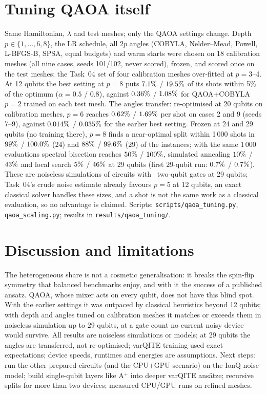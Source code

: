 \documentclass[10pt,twocolumn]{article}
\begin{document}
\section{Tuning QAOA itself}
Same Hamiltonian, $\lambda$ and test meshes; only the QAOA settings change. Depth $p\in\{1,\dots,6,8\}$, the LR schedule, all $2p$ angles (COBYLA, Nelder--Mead, Powell, L-BFGS-B, SPSA, equal budgets) and warm starts were chosen on 18 calibration meshes (all nine cases, seeds 101/102, never scored), frozen, and scored once on the test meshes; the Task~04 set of four calibration meshes over-fitted at $p{=}3$--4. At 12 qubits the best setting at $p{=}8$ puts $7.1\%$ / $19.5\%$ of its shots within 5\% of the optimum ($\alpha{=}0.5$ / $0.8$), against $0.36\%$ / $1.08\%$ for QAOA+COBYLA $p{=}2$ trained on each test mesh. The angles transfer: re-optimised at 20 qubits on calibration meshes, $p{=}6$ reaches $0.62\%$ / $1.69\%$ per shot on cases 2 and 9 (seeds 7--9), against $0.014\%$ / $0.035\%$ for the earlier best setting. Frozen at 24 and 29 qubits (no training there), $p{=}8$ finds a near-optimal split within 1\,000 shots in $99\%$ / $100.0\%$ (24) and $88\%$ / $99.6\%$ (29) of the instances; with the same 1\,000 evaluations spectral bisection reaches $50\%$ / $100\%$, simulated annealing $10\%$ / $43\%$ and local search $5\%$ / $46\%$ at 29 qubits (first 29-qubit run: $0.7\%$ / $0.7\%$). These are noiseless simulations of circuits with \TuneTwentyNineGates\ two-qubit gates at 29 qubits; Task~04's crude noise estimate already favours $p{=}5$ at 12 qubits, an exact classical solver handles these sizes, and a shot is not the same work as a classical evaluation, so no advantage is claimed. Scripts: \texttt{scripts/qaoa\_tuning.py}, \texttt{qaoa\_scaling.py}; results in \texttt{results/qaoa\_tuning/}.

\section{Discussion and limitations}
The heterogeneous share is not a cosmetic generalisation: it breaks the spin-flip symmetry that balanced benchmarks enjoy, and with it the success of a published ansatz. QAOA, whose mixer acts on every qubit, does not have this blind spot. With the earlier settings it was outpaced by classical heuristics beyond 12 qubits; with depth and angles tuned on calibration meshes it matches or exceeds them in noiseless simulation up to 29 qubits, at a gate count no current noisy device would survive. All results are noiseless simulations or models; at 29 qubits the angles are transferred, not re-optimised; varQITE training used exact expectations; device speeds, runtimes and energies are assumptions. Next steps: run the other prepared circuits (and the CPU+GPU scenario) on the IonQ noise model; build single-qubit layers like A$^+$ into deeper varQITE ansätze; recursive splits for more than two devices; measured CPU/GPU runs on refined meshes.
\end{document}
